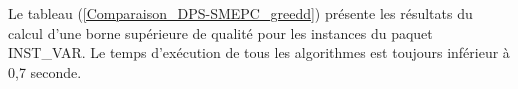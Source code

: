   Le tableau (\ref{Comparaison_DPS-SMEPC_greedd}) présente les résultats du calcul d'une borne supérieure de qualité pour les instances du paquet INST\_VAR. 
   Le temps d'exécution de tous les algorithmes est toujours inférieur à 0,7 seconde.
   
  		
  		
  		
  		
  									
